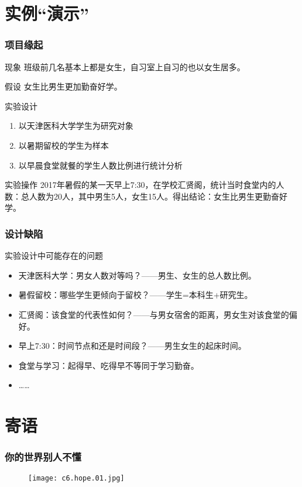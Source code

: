 \section{实例“演示”}
\begin{frame}
  \frametitle{项目缘起}
  \begin{block}{现象}
    班级前几名基本上都是女生，自习室上自习的也以女生居多。
  \end{block}
  \vspace{-0.5em}
  \pause
  \begin{block}{假设}
    女生比男生更加勤奋好学。
  \end{block}
  \pause
  \begin{block}{实验设计}
    \begin{enumerate}[<+->]
      \item 以天津医科大学学生为研究对象
      \item 以暑期留校的学生为样本
      \item 以早晨食堂就餐的学生人数比例进行统计分析
    \end{enumerate}
  \end{block}
  \vspace{-0.5em}
  \pause
  \begin{block}{实验操作}
    2017年暑假的某一天早上7:30，在学校汇贤阁，统计当时食堂内的人数：总人数为20人，其中男生5人，女生15人。得出结论：女生比男生更勤奋好学。
  \end{block}
\end{frame}

\begin{frame}
  \frametitle{设计缺陷}
  \begin{block}{实验设计中可能存在的问题}
    \begin{itemize}
      \item 天津医科大学：男女人数对等吗？——男生、女生的总人数比例。
      \item 暑假留校：哪些学生更倾向于留校？——学生=本科生+研究生。
      \item 汇贤阁：该食堂的代表性如何？——与男女宿舍的距离，男女生对该食堂的偏好。
      \item 早上7:30：时间节点和还是时间段？——男生女生的起床时间。
      \item 食堂与学习：起得早、吃得早不等同于学习勤奋。
      \item ……
    \end{itemize}
  \end{block}
\end{frame}

\section{寄语}
\begin{frame}
  \frametitle{你的世界别人不懂}
  \begin{figure}
    \centering
    \texttt{[image: c6.hope.01.jpg]}
  \end{figure}
\end{frame}

